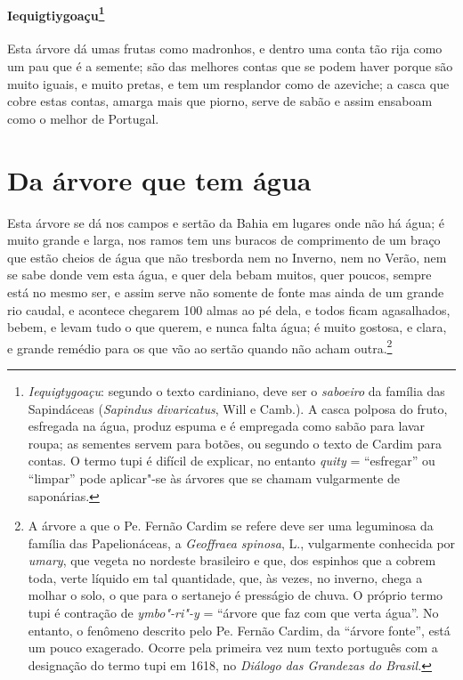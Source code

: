 \paragraph{Iequigtiygoaçu\footnote{ \textit{Iequigtygoaçu}: segundo o
texto cardiniano, deve ser o \textit{saboeiro} da família das
Sapindáceas (\textit{Sapindus divaricatus}, Will e Camb.). A casca
polposa do fruto, esfregada na água, produz espuma e é empregada como
sabão para lavar roupa; as sementes servem para botões, ou segundo o
texto de Cardim para contas. O termo tupi é difícil de explicar, no
entanto \textit{quity} = ``esfregar'' ou ``limpar'' pode aplicar"-se às
árvores que se chamam vulgarmente de saponárias.}} Esta
árvore dá umas frutas como madronhos, e dentro uma conta tão rija como
um pau que é a semente; são das melhores contas que se podem haver
porque são muito iguais, e muito pretas, e tem um resplandor como de
azeviche; a casca que cobre estas contas, amarga mais que piorno, serve
de sabão e assim ensaboam como o melhor de Portugal. 



\section{Da árvore que tem água}
Esta árvore se dá nos campos e sertão da Bahia em lugares
onde não há água; é muito grande e larga, nos ramos tem uns buracos de
comprimento de um braço que estão cheios de água que não tresborda nem
no Inverno, nem no Verão, nem se sabe donde vem esta água, e quer dela
bebam muitos, quer poucos, sempre está no mesmo ser, e assim serve
não somente de fonte mas ainda de um grande rio caudal, e acontece
chegarem 100 almas ao pé dela, e todos ficam agasalhados, bebem, e
levam tudo o que querem, e nunca falta água; é muito gostosa, e clara,
e grande remédio para os que vão ao sertão quando não acham
outra.\footnote{ A árvore a que o Pe. Fernão Cardim se refere deve ser
uma leguminosa da família das Papelionáceas, a \textit{Geoffraea
spinosa}, L., vulgarmente conhecida por \textit{umary}, que vegeta no
nordeste brasileiro e que, dos espinhos que a cobrem toda, verte
líquido em tal quantidade, que, às vezes, no inverno, chega a molhar o
solo, o que para o sertanejo é presságio de chuva. O próprio termo tupi
é contração de \textit{ymbo"-ri"-y} = ``árvore que faz com que verta
água''. No entanto, o fenômeno descrito pelo Pe. Fernão Cardim, da
``árvore fonte'', está um pouco exagerado. Ocorre pela primeira vez num
texto português com a designação do termo tupi em 1618, no
\textit{Diálogo das Grandezas do Brasil.}} 


